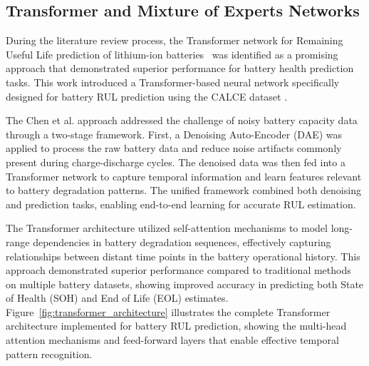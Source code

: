 \subsection{Transformer and Mixture of Experts Networks}
\label{subsec:transformer_moe_networks}

During the literature review process, the Transformer network for Remaining Useful Life prediction of lithium-ion batteries~\cite{chen_transformer_2022} was identified as a promising approach that demonstrated superior performance for battery health prediction tasks. This work introduced a Transformer-based neural network specifically designed for battery RUL prediction using the CALCE dataset \cite{CALCE_battery_nodate}.

The Chen et al. approach addressed the challenge of noisy battery capacity data through a two-stage framework. First, a Denoising Auto-Encoder (DAE) was applied to process the raw battery data and reduce noise artifacts commonly present during charge-discharge cycles. The denoised data was then fed into a Transformer network to capture temporal information and learn features relevant to battery degradation patterns. The unified framework combined both denoising and prediction tasks, enabling end-to-end learning for accurate RUL estimation.

The Transformer architecture utilized self-attention mechanisms to model long-range dependencies in battery degradation sequences, effectively capturing relationships between distant time points in the battery operational history. This approach demonstrated superior performance compared to traditional methods on multiple battery datasets, showing improved accuracy in predicting both State of Health (SOH) and End of Life (EOL) estimates. Figure~\ref{fig:transformer_architecture} illustrates the complete Transformer architecture implemented for battery RUL prediction, showing the multi-head attention mechanisms and feed-forward layers that enable effective temporal pattern recognition.

